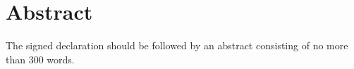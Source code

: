 \chapter{Abstract}

The signed declaration should be followed by an abstract consisting of no more than 300 words.
